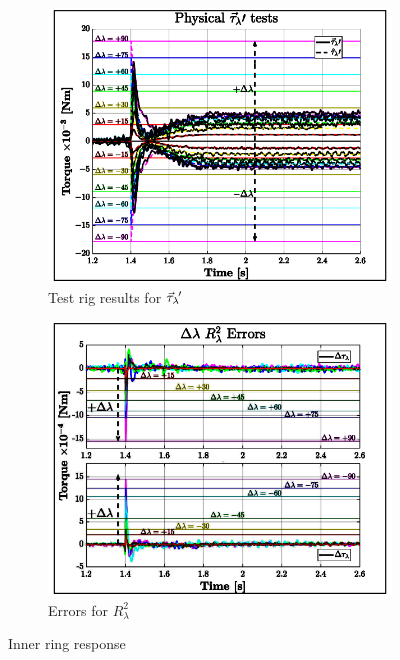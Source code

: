 \begin{figure}[hbtp]
\vspace{-10pt}
\centering
\begin{subfigure}{0.495\textwidth}
\centering
\includegraphics[width=\textwidth]{graphs/tau-lambda}
\caption{Test rig results for $\vec{\tau}_\lambda\hspace{-1pt}'$}
\label{fig:tau-lambda}
\end{subfigure}
\begin{subfigure}{0.495\textwidth}
\centering
\includegraphics[width=\textwidth]{graphs/tau-lambda-r}
\caption{Errors for $R^2_{\lambda}$}
\label{fig:tau-lambda-r}
\end{subfigure}
\vspace{-4pt}
\caption{Inner ring response}
\vspace{-10pt}
\end{figure}
